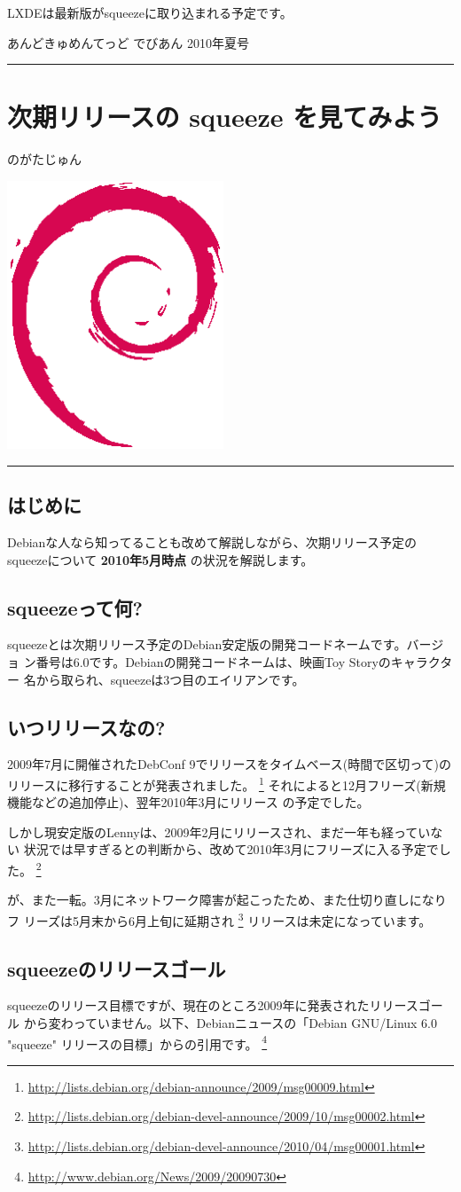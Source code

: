 \documentclass[mingoth,a4paper]{jsarticle}
\renewcommand{\dancersection}[2]{%
\newpage
あんどきゅめんてっど でびあん 2010年夏号
%
\vspace{0.1mm}\\
{\color{dancerlightblue}\rule{\hsize}{2mm}}

%
%
\begin{minipage}[t]{0.6\hsize}
\color{dancerdarkblue}
\vspace{1cm}
\section{#1}
\hfill{}#2\\
\end{minipage}
\begin{minipage}[t]{0.4\hsize}
\vspace{-2cm}
\hfill{}\includegraphics[height=8cm]{image200502/openlogo-nd.eps}\\
\vspace{-5cm}
\end{minipage}
%
%
{\color{dancerdarkblue}\rule{0.74\hsize}{2mm}}
%
\vspace{2cm}
}
\begin{document}
LXDEは最新版がsqueezeに取り込まれる予定です。

\dancersection{次期リリースの squeeze を見てみよう}{のがたじゅん}

\subsection{はじめに}
Debianな人なら知ってることも改めて解説しながら、次期リリース予定の
squeezeについて {\bf 2010年5月時点} の状況を解説します。

\subsection{squeezeって何?}
squeezeとは次期リリース予定のDebian安定版の開発コードネームです。バージョ
ン番号は6.0です。Debianの開発コードネームは、映画Toy Storyのキャラクター
名から取られ、squeezeは3つ目のエイリアンです。

\subsection{いつリリースなの?}
\label{sec:when-release-squeeze}

2009年7月に開催されたDebConf 9でリリースをタイムベース(時間で区切って)の
リリースに移行することが発表されました。
\footnote{\url{http://lists.debian.org/debian-announce/2009/msg00009.html}}
それによると12月フリーズ(新規機能などの追加停止)、翌年2010年3月にリリース
の予定でした。

しかし現安定版のLennyは、2009年2月にリリースされ、まだ一年も経っていない
状況では早すぎるとの判断から、改めて2010年3月にフリーズに入る予定でした。
\footnote{\url{http://lists.debian.org/debian-devel-announce/2009/10/msg00002.html}}

が、また一転。3月にネットワーク障害が起こったため、また仕切り直しになりフ
リーズは5月末から6月上旬に延期され
\footnote{\url{http://lists.debian.org/debian-devel-announce/2010/04/msg00001.html}}
リリースは未定になっています。

\subsection{squeezeのリリースゴール}
squeezeのリリース目標ですが、現在のところ2009年に発表されたリリースゴール
から変わっていません。以下、Debianニュースの「Debian GNU/Linux 6.0
"squeeze" リリースの目標」からの引用です。
\footnote{\url{http://www.debian.org/News/2009/20090730}}
\end{document}
